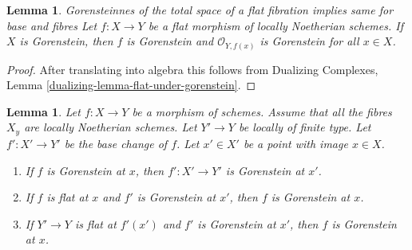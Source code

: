 \documentclass{stacks-project}
\newenvironment{slogan}{\comment}{\endcomment}
\theoremstyle{plain}
\newtheorem{lemma}[subsection]{Lemma}
\theoremstyle{definition}
\theoremstyle{remark}
\numberwithin{equation}{subsection}
\begin{document}
\begin{lemma}
\label{lemma-flat-morphism-from-gorenstein-scheme}
\begin{slogan}
Gorensteinnes of the total space of a flat fibration implies
same for base and fibres
\end{slogan}
Let $f : X \to Y$ be a flat morphism of locally Noetherian schemes.
If $X$ is Gorenstein, then $f$ is Gorenstein and $\mathcal{O}_{Y, f(x)}$
is Gorenstein for all $x \in X$.
\end{lemma}

\begin{proof}
After translating into algebra this follows from
Dualizing Complexes, Lemma \ref{dualizing-lemma-flat-under-gorenstein}.
\end{proof}

\begin{lemma}
\label{lemma-base-change-gorenstein}
Let $f : X \to Y$ be a morphism of schemes.
Assume that all the fibres $X_y$ are locally Noetherian schemes.
Let $Y' \to Y$ be locally of finite type. Let $f' : X' \to Y'$
be the base change of $f$.
Let $x' \in X'$ be a point with image $x \in X$.
\begin{enumerate}
\item If $f$ is Gorenstein at $x$, then
$f' : X' \to Y'$ is Gorenstein at $x'$.
\item If $f$ is flat at $x$ and $f'$ is Gorenstein at $x'$, then $f$
is Gorenstein at $x$.
\item If $Y' \to Y$ is flat at $f'(x')$ and $f'$ is Gorenstein at
$x'$, then $f$ is Gorenstein at $x$.
\end{enumerate}
\end{lemma}
\end{document}
